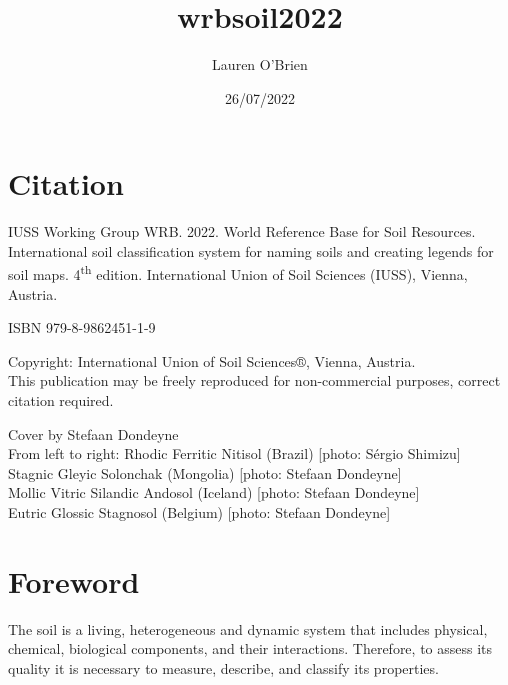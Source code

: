 \documentclass[
  letterpaper,
  DIV=11,
  numbers=noendperiod]{scrreprt}
\title{wrbsoil2022}
\author{Lauren O'Brien}
\date{26/07/2022}
\renewcommand*\contentsname{Table of contents}
\newcommand\contentsname{Table of contents}
\begin{document}
\maketitle
\ifdefined\Shaded\renewenvironment{Shaded}{\begin{tcolorbox}[sharp corners, enhanced, boxrule=0pt, frame hidden, breakable, borderline west={3pt}{0pt}{shadecolor}, interior hidden]}{\end{tcolorbox}}\fi

\renewcommand*\contentsname{Table of contents}
{
\hypersetup{linkcolor=}
\setcounter{tocdepth}{2}
\tableofcontents
}

\hypertarget{citation}{%
\chapter{Citation}\label{citation}}

IUSS Working Group WRB. 2022. World Reference Base for Soil Resources.
International soil classification system for naming soils and creating
legends for soil maps. 4\textsuperscript{th} edition. International
Union of Soil Sciences (IUSS), Vienna, Austria.

ISBN 979-8-9862451-1-9

Copyright: International Union of Soil Sciences®, Vienna, Austria.\\
This publication may be freely reproduced for non-commercial purposes,
correct citation required.

Cover by Stefaan Dondeyne\\
From left to right: Rhodic Ferritic Nitisol (Brazil) {[}photo: Sérgio
Shimizu{]}\\
Stagnic Gleyic Solonchak (Mongolia) {[}photo: Stefaan Dondeyne{]}\\
Mollic Vitric Silandic Andosol (Iceland) {[}photo: Stefaan Dondeyne{]}\\
Eutric Glossic Stagnosol (Belgium) {[}photo: Stefaan Dondeyne{]}


\hypertarget{foreword}{%
\chapter{Foreword}\label{foreword}}

The soil is a living, heterogeneous and dynamic system that includes
physical, chemical, biological components, and their interactions.
Therefore, to assess its quality it is necessary to measure, describe,
and classify its properties.
\end{document}
